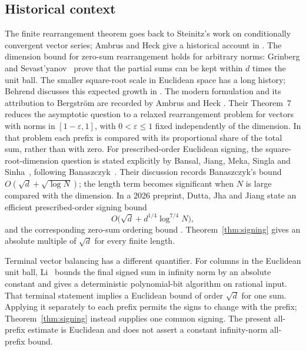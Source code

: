 \subsection{Historical context}

The finite rearrangement theorem goes back to Steinitz's work on
conditionally convergent vector series; Ambrus and Heck give a historical
account in \cite[Section~2]{AmbrusHeck2026}.
The dimension bound for zero-sum rearrangement holds for arbitrary norms:
Grinberg and Sevast'yanov~\cite[Theorem~1]{GrinbergSevastyanov1980} prove
that the partial sums can be kept within $d$ times the unit ball.
The smaller square-root scale in Euclidean space has a long history;
Behrend discusses this expected growth in
\cite[p.~108]{Behrend1954}. The modern formulation and its attribution
to Bergstr\"om are recorded by Ambrus and Heck
\cite[Conjecture~5]{AmbrusHeck2026}. Their Theorem~7 reduces the
asymptotic question to a relaxed rearrangement problem for vectors with
norms in $[1-\varepsilon,1]$, with $0<\varepsilon\le1$ fixed independently
of the dimension. In that problem each prefix is compared with its
proportional share of the total sum, rather than with zero.
For prescribed-order Euclidean signing, the square-root-dimension
question is stated explicitly by Bansal, Jiang, Meka, Singla and
Sinha~\cite[Section~6, Conjecture~6.3]{BansalEtAl2021Full}, following
Banaszczyk~\cite{Banaszczyk2012}. Their discussion records Banaszczyk's
bound $O(\sqrt d+\sqrt{\log N})$; the length term becomes significant when
$N$ is large compared with the dimension. In a 2026 preprint, Dutta, Jha
and Jiang state an efficient prescribed-order signing bound
\[
 O\bigl(\sqrt d+d^{1/4}\log^{7/4}N\bigr),
\]
and the corresponding zero-sum ordering bound
\cite[Theorem~1.1 and Corollary~1.2]{DuttaJhaJiang2026}.
Theorem~\ref{thm:signing} gives an absolute multiple of $\sqrt d$
for every finite length.

Terminal vector balancing has a different quantifier. For columns in the
Euclidean unit ball, Li~\cite[Theorem~1.1]{Li2026} bounds the final
signed sum in infinity norm by an absolute constant and gives a
deterministic polynomial-bit algorithm on rational input. That terminal
statement implies a Euclidean bound of order $\sqrt d$ for one sum.
Applying it separately to each prefix permits the signs to change with
the prefix; Theorem~\ref{thm:signing} instead supplies one common signing.
The present all-prefix estimate is Euclidean and does not assert a
constant infinity-norm all-prefix bound.

